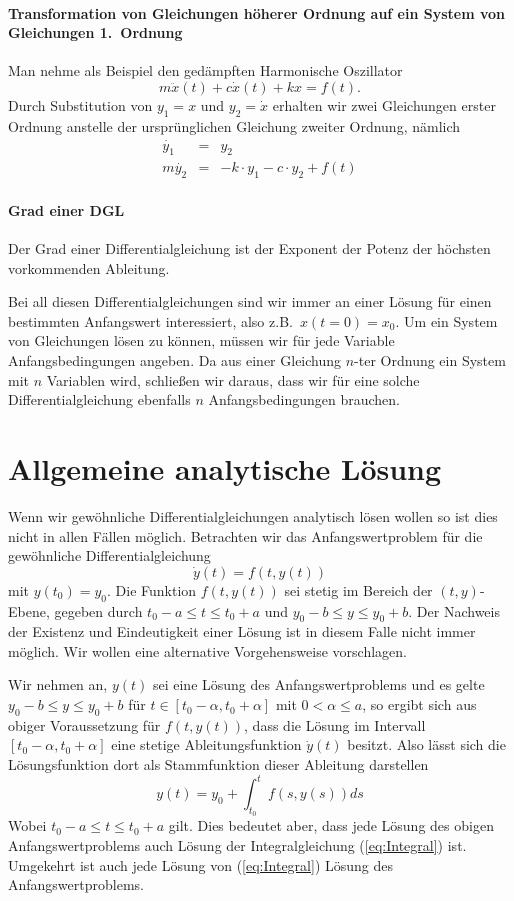 \paragraph{Transformation von Gleichungen höherer Ordnung auf ein System von Gleichungen 1.\ Ordnung}
		Man nehme als Beispiel den gedämpften Harmonische Oszillator
		\[m\ddot{x}(t)+c\dot{x}(t)+kx=f(t).\] Durch Substitution von 
		$y_1=x$ und $y_2=\dot{x}$ erhalten wir zwei Gleichungen erster 		Ordnung anstelle der ursprünglichen Gleichung zweiter Ordnung, nämlich 
		\begin{eqnarray*} 
		  \dot{y_1} &=& y_2\\
	 	  m\dot{y_2}&=&-k\cdot y_1-c\cdot y_2+f(t)
	       \end{eqnarray*}
\paragraph{Grad einer DGL}
	     Der Grad einer Differentialgleichung ist der Exponent der Potenz der höchsten vorkommenden Ableitung.

Bei all diesen Differentialgleichungen sind wir immer an einer Lösung für
einen bestimmten Anfangswert interessiert, also z.B.\ $x(t=0)=x_0$. Um ein
System von Gleichungen lösen zu können, müssen wir für jede Variable
Anfangsbedingungen angeben. Da aus einer Gleichung $n$-ter Ordnung ein System mit $n$ Variablen wird, schließen wir daraus, dass wir für eine solche
Differentialgleichung ebenfalls $n$ Anfangsbedingungen brauchen.
%
\section{Allgemeine analytische Lösung}\label{sec:analyticsolu}
Wenn wir gewöhnliche Differentialgleichungen analytisch lösen wollen so ist
dies nicht in allen Fällen möglich. Betrachten wir das Anfangswertproblem
für die gewöhnliche Differentialgleichung
\[ \dot{y}(t) = f\left(t,y(t)\right)\]
mit $y(t_0)=y_0$. Die Funktion $f(t,y(t))$ sei stetig im Bereich der
$(t,y)$-Ebene, gegeben durch $t_0-a\le t\le t_0+a$ und $y_0 -b\le y\le y_0+b$.
Der Nachweis der Existenz und Eindeutigkeit einer Lösung ist in diesem Falle
nicht immer möglich. Wir wollen eine alternative Vorgehensweise vorschlagen.

Wir nehmen an, $y(t)$ sei eine Lösung des Anfangswertproblems und es gelte
$y_0 -b\le y\le y_0+b$ für $t\in [t_0-\alpha,t_0+\alpha]$ mit $0<\alpha\le a$,
so ergibt sich aus obiger Voraussetzung für $f(t,y(t))$, dass die Lösung im
Intervall $[t_0-\alpha,t_0+\alpha]$ eine stetige Ableitungsfunktion
$\dot{y}(t)$ besitzt.  Also lässt sich die Lösungsfunktion dort als
Stammfunktion dieser Ableitung darstellen 
\begin{equation}\label{eq:Integral}
  y(t)=y_0+\int_{t_0}^t f(s,y(s))ds 
\end{equation}
Wobei $t_0-a\le t\le t_0+a$ gilt. Dies bedeutet aber, dass jede Lösung des
obigen Anfangswertproblems auch Lösung der Integralgleichung
(\ref{eq:Integral}) ist. Umgekehrt ist auch jede Lösung von
(\ref{eq:Integral}) Lösung des Anfangswertproblems.

